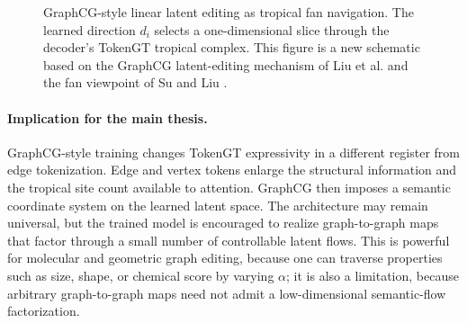 \documentclass[11pt]{article}
\begin{document}
\begin{figure}[t]
\centering
{}
\caption{GraphCG-style linear latent editing as tropical fan navigation.  The learned direction $d_i$ selects a one-dimensional slice through the decoder's TokenGT tropical complex.  This figure is a new schematic based on the GraphCG latent-editing mechanism of Liu et al. \cite{liu2024graphcg} and the fan viewpoint of Su and Liu \cite{su2026tropicalexpressivity}.}
\label{fig:graphcg-fanslice}
\end{figure}

\paragraph{Implication for the main thesis.}
GraphCG-style training changes TokenGT expressivity in a different register from edge tokenization.  Edge and vertex tokens enlarge the structural information and the tropical site count available to attention.  GraphCG then imposes a semantic coordinate system on the learned latent space.  The architecture may remain universal, but the trained model is encouraged to realize graph-to-graph maps that factor through a small number of controllable latent flows.  This is powerful for molecular and geometric graph editing, because one can traverse properties such as size, shape, or chemical score by varying $\alpha$; it is also a limitation, because arbitrary graph-to-graph maps need not admit a low-dimensional semantic-flow factorization.
\end{document}
